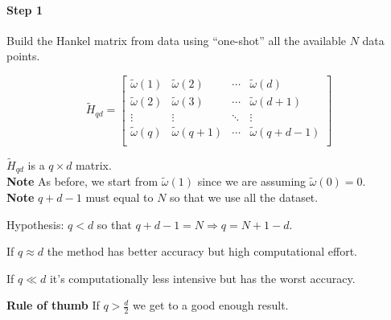 
\paragraph{Step 1} Build the Hankel matrix from data using ``one-shot'' all the available $N$ data points.

\[
    \tilde{H}_{qd} = \begin{bmatrix}
        \tilde{\omega}(1) & \tilde{\omega}(2) & \cdots & \tilde{\omega}(d) \\
        \tilde{\omega}(2) & \tilde{\omega}(3) & \cdots & \tilde{\omega}(d+1) \\
        \vdots            & \vdots            & \ddots & \vdots \\
        \tilde{\omega}(q) & \tilde{\omega}(q+1) & \cdots & \tilde{\omega}(q+d-1) \\
    \end{bmatrix}
\]

$\tilde{H}_{qd}$ is a $q\times d$ matrix.\\
\textbf{Note} As before, we start from $\tilde{\omega}(1)$ since we are assuming $\tilde{\omega}(0)=0$. \\
\textbf{Note} $q+d-1$ must equal to $N$ so that we use all the dataset.


\begin{remark}
    Hypothesis: $q<d$ so that $q+d-1=N \Rightarrow q=N+1-d$.
    \begin{figure}[H]
        \centering
    \end{figure}

    If $q \approx d$ the method has better accuracy but high computational effort.
    
    If $q \ll d$ it's computationally less intensive but has the worst accuracy.

    \textbf{Rule of thumb} If $ q > \frac{d}{2}$ we get to a good enough result.
\end{remark}


